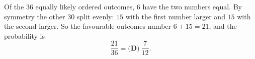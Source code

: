 Of the $36$ equally likely ordered outcomes, $6$ have the two numbers equal. By symmetry the other $30$ split evenly: $15$ with the first number larger and $15$ with the second larger. So the favourable outcomes number $6+15=21$, and the probability is
\[
\dfrac{21}{36}=\boxed{\textbf{(D)}\ \dfrac{7}{12}}.
\]

